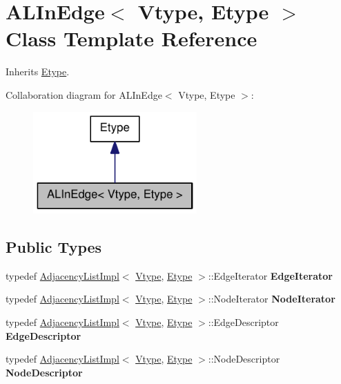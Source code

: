 \hypertarget{class_a_l_in_edge}{
\section{ALInEdge$<$ Vtype, Etype $>$ Class Template Reference}
\label{class_a_l_in_edge}
}


Inherits \hyperlink{class_etype}{Etype}.



Collaboration diagram for ALInEdge$<$ Vtype, Etype $>$:\nopagebreak
\begin{figure}[H]
\begin{center}
\leavevmode
\includegraphics[width=178pt]{class_a_l_in_edge__coll__graph}
\end{center}
\end{figure}
\subsection*{Public Types}
\begin{DoxyCompactItemize}
\item 
\hypertarget{class_a_l_in_edge_ac9b6dbe9edcf0bd9908bc0e13bbac3c8}{
typedef \hyperlink{class_adjacency_list_impl}{AdjacencyListImpl}$<$ \hyperlink{class_vtype}{Vtype}, \hyperlink{class_etype}{Etype} $>$::EdgeIterator {\bfseries EdgeIterator}}
\label{class_a_l_in_edge_ac9b6dbe9edcf0bd9908bc0e13bbac3c8}

\item 
\hypertarget{class_a_l_in_edge_a251c4d3f6d785a0db7af1424c88849b1}{
typedef \hyperlink{class_adjacency_list_impl}{AdjacencyListImpl}$<$ \hyperlink{class_vtype}{Vtype}, \hyperlink{class_etype}{Etype} $>$::NodeIterator {\bfseries NodeIterator}}
\label{class_a_l_in_edge_a251c4d3f6d785a0db7af1424c88849b1}

\item 
\hypertarget{class_a_l_in_edge_a703e2fa708f7621aff8039c8b36508c8}{
typedef \hyperlink{class_adjacency_list_impl}{AdjacencyListImpl}$<$ \hyperlink{class_vtype}{Vtype}, \hyperlink{class_etype}{Etype} $>$::EdgeDescriptor {\bfseries EdgeDescriptor}}
\label{class_a_l_in_edge_a703e2fa708f7621aff8039c8b36508c8}

\item 
\hypertarget{class_a_l_in_edge_a380bbada8c0b09a60fa21fa3ee681e1d}{
typedef \hyperlink{class_adjacency_list_impl}{AdjacencyListImpl}$<$ \hyperlink{class_vtype}{Vtype}, \hyperlink{class_etype}{Etype} $>$::NodeDescriptor {\bfseries NodeDescriptor}}
\label{class_a_l_in_edge_a380bbada8c0b09a60fa21fa3ee681e1d}

\end{DoxyCompactItemize}
